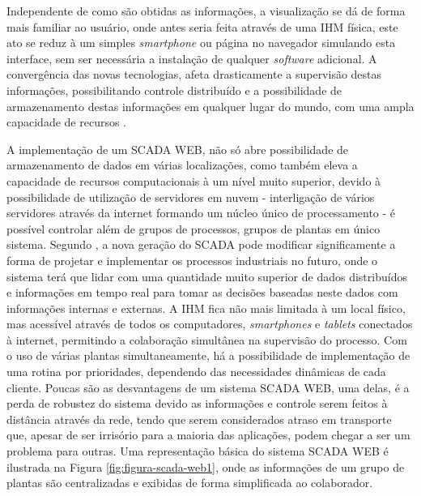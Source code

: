 \begin{figure}[!h]
{}	
\end{figure}

Independente de como são obtidas as informações, a visualização se dá de forma mais familiar ao usuário, onde antes seria feita através de uma \gls{IHM} física, este ato se reduz à um simples \textit{smartphone} ou página no navegador simulando esta interface, sem ser necessária a instalação de qualquer \textit{software} adicional. A convergência das novas tecnologias, afeta drasticamente a supervisão destas informações, possibilitando controle distribuído e a possibilidade de armazenamento destas informações em qualquer lugar do mundo, com uma ampla capacidade de recursos \cite{ScadaWebInterOp}.

A implementação de um \gls{SCADA} \gls{WEB}, não só abre possibilidade de armazenamento de dados em várias localizações, como também eleva a capacidade de recursos computacionais à um nível muito superior, devido à possibilidade de utilização de servidores em nuvem - interligação de vários servidores através da internet formando um núcleo único de processamento - é possível controlar além de grupos de processos, grupos de plantas em único sistema. Segundo \cite{ScadaNextGer}, a nova geração do \gls{SCADA} pode modificar significamente a forma de projetar e implementar os processos industriais no futuro, onde o sistema terá que lidar com uma quantidade muito superior de dados distribuídos e informações em tempo real para tomar as decisões baseadas neste dados com informações internas e externas. A \gls{IHM} fica não mais limitada à um local físico, mas acessível através de todos os computadores, \textit{smartphones} e \textit{tablets} conectados à internet, permitindo a colaboração simultânea na supervisão do processo. Com o uso de várias plantas simultaneamente, há a possibilidade de implementação de uma rotina por prioridades, dependendo das necessidades dinâmicas de cada cliente.  Poucas são as desvantagens de um sistema \gls{SCADA} \gls{WEB}, uma delas, é a perda de robustez do sistema devido as informações e controle serem feitos à distância através da rede, tendo que serem considerados atraso em transporte que, apesar de ser irrisório para a maioria das aplicações, podem chegar a ser um problema para outras. Uma representação básica do sistema \gls{SCADA} \gls{WEB} é ilustrada na Figura \ref{fig:figura-scada-web1}, onde as informações de um grupo de plantas são centralizadas e exibidas de forma simplificada ao colaborador.

